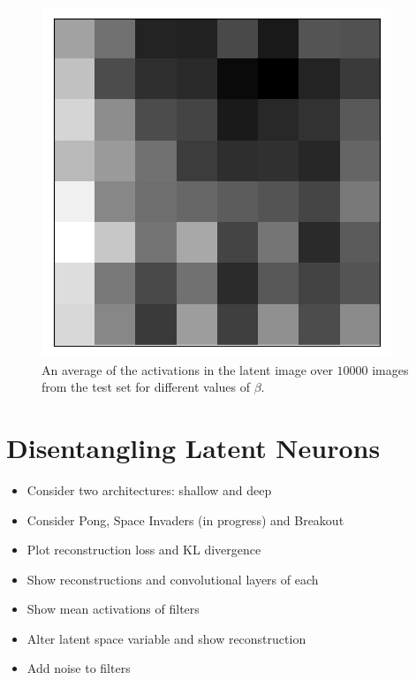 \begin{figure}[h!]
\begin{multicols}{3}
    \includegraphics[scale=0.4]{figures/results/latent_image/beta_4_average_activation.png}
    \caption{$\beta=4$}
\end{multicols}
\caption{An average of the activations in the latent image over $10000$ images from the test set for different values of $\beta$.}
\label{fig:latent_image_originals_posterior_samples}
\end{figure}

%
%
%
%
%
\section{Disentangling Latent Neurons}
\begin{itemize}
\item Consider two architectures: shallow and deep
\item Consider Pong, Space Invaders (in progress) and Breakout
\item Plot reconstruction loss and KL divergence
\item Show reconstructions and convolutional layers of each
\item Show mean activations of filters
\item Alter latent space variable and show reconstruction
\item Add noise to filters
\end{itemize}


